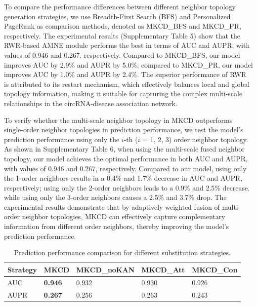 \documentclass[journal,twoside,web]{ieeecolor}
\begin{document}
To compare the performance differences between different neighbor topology generation strategies, we use Breadth-First Search (BFS) and Personalized PageRank as comparison methods, denoted as MKCD\_BFS and MKCD\_PR, respectively. The experimental results (Supplementary Table 5) show that the RWR-based AMNE module performs the best in terms of AUC and AUPR, with values of 0.946 and 0.267, respectively. Compared to MKCD\_BFS, our model improves AUC by 2.9\% and AUPR by 5.0\%; compared to MKCD\_PR, our model improves AUC by 1.0\% and AUPR by 2.4\%. The superior performance of RWR is attributed to its restart mechanism, which effectively balances local and global topology information, making it suitable for capturing the complex multi-scale relationships in the circRNA-disease association network.%

To verify whether the multi-scale neighbor topology in MKCD outperforms single-order neighbor topologies in prediction performance, we test the model's prediction performance using only the $i$-th ($i$ = 1, 2, 3) order neighbor topology. As shown in Supplementary Table 6, when using the multi-scale fused neighbor topology, our model achieves the optimal performance in both AUC and AUPR, with values of 0.946 and 0.267, respectively. Compared to our model, using only the 1-order neighbors results in a 0.4\% and 1.7\% decrease in AUC and AUPR, respectively; using only the 2-order neighbors leads to a 0.9\% and 2.5\% decrease, while using only the 3-order neighbors causes a 2.5\% and 3.7\% drop. The experimental results demonstrate that by adaptively weighted fusion of multi-order neighbor topologies, MKCD can effectively capture complementary information from different order neighbors, thereby improving the model's prediction performance.%

\begin{table}
	\centering
	\begin{threeparttable}[b]
		 \caption{Prediction performance comparison for different substitution strategies.}\label{tab:tab_S}
    \label{tab:S}
        \begin{tabular}{p{1cm}<{\centering} p{1cm}<{\centering} p{1.7cm}<{\centering} p{1.2cm}<{\centering} p{1.3cm}<{\centering} }
            \hline
            \textbf{Strategy} & MKCD & MKCD\_noKAN & MKCD\_Att & MKCD\_Con\\
            \hline
            AUC & \textbf{0.946} & 0.932 & 0.930 &  0.926 \\
            AUPR & \textbf{0.267} & 0.256 & 0.263 &  0.243 \\
            \hline
        \end{tabular}
		\vspace{-0.4cm}
	\end{threeparttable}
\end{table}
\end{document}
